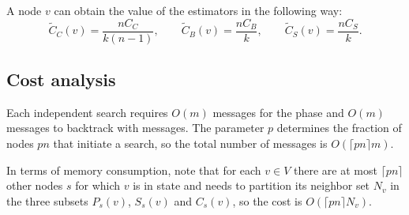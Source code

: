 A node $v$ can obtain the value of the estimators in the following way:
\begin{equation*}
\widetilde{C}_C(v) = \frac{n C_C}{k(n-1)} , \qquad
\widetilde{C}_B(v) = \frac{n C_B}{k} , \qquad
\widetilde{C}_S(v) = \frac{n C_S}{k} .
\end{equation*}

\subsection{Cost analysis}

Each independent search requires $O(m)$ messages for the \mdisc{} phase and $O(m)$ messages to backtrack with \mrep{} messages. The parameter $p$ determines the fraction of nodes $pn$ that initiate a \mdisc{} search, so the total number of messages is $O(\lceil pn \rceil m)$.

In terms of memory consumption, note that for each $v \in V$ there are at most $\lceil pn \rceil$ other nodes $s$ for which $v$ is in state  and needs to partition its neighbor set $N_v$ in the three subsets $P_s(v)$, $S_s(v)$ and $C_s(v)$, so the cost is $O(\lceil pn \rceil N_v)$.